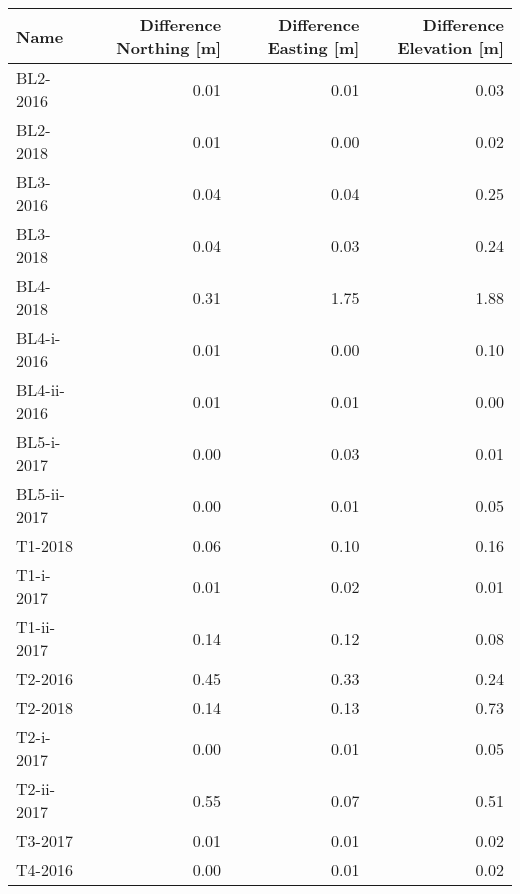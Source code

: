 \begin{tabular}{lrrr}
\toprule
        Name &  Difference Northing [m] &  Difference Easting [m] &  Difference Elevation [m] \\
\midrule
    BL2-2016 &                     0.01 &                    0.01 &                      0.03 \\
    BL2-2018 &                     0.01 &                    0.00 &                      0.02 \\
    BL3-2016 &                     0.04 &                    0.04 &                      0.25 \\
    BL3-2018 &                     0.04 &                    0.03 &                      0.24 \\
    BL4-2018 &                     0.31 &                    1.75 &                      1.88 \\
  BL4-i-2016 &                     0.01 &                    0.00 &                      0.10 \\
 BL4-ii-2016 &                     0.01 &                    0.01 &                      0.00 \\
  BL5-i-2017 &                     0.00 &                    0.03 &                      0.01 \\
 BL5-ii-2017 &                     0.00 &                    0.01 &                      0.05 \\
     T1-2018 &                     0.06 &                    0.10 &                      0.16 \\
   T1-i-2017 &                     0.01 &                    0.02 &                      0.01 \\
  T1-ii-2017 &                     0.14 &                    0.12 &                      0.08 \\
     T2-2016 &                     0.45 &                    0.33 &                      0.24 \\
     T2-2018 &                     0.14 &                    0.13 &                      0.73 \\
   T2-i-2017 &                     0.00 &                    0.01 &                      0.05 \\
  T2-ii-2017 &                     0.55 &                    0.07 &                      0.51 \\
     T3-2017 &                     0.01 &                    0.01 &                      0.02 \\
     T4-2016 &                     0.00 &                    0.01 &                      0.02 \\

\end{tabular}
